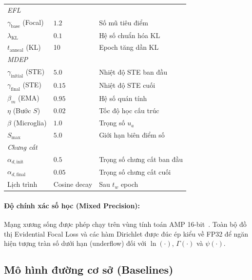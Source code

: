 \documentclass[11pt, a4paper]{article}
\begin{document}
\begin{table}[H]
\begin{tabular}{@{}lll@{}}
\midrule
\multicolumn{3}{l}{\emph{EFL}} \\
$\gamma_{\text{base}}$ (Focal) & $1.2$ & Số mũ tiêu điểm \\
$\lambda_{\text{KL}}$ & $0.1$ & Hệ số chuẩn hóa KL \\
$t_{\text{anneal}}$ (KL) & 10 & Epoch tăng dần KL \\
\midrule
\multicolumn{3}{l}{\emph{MDEP}} \\
$\gamma_{\text{initial}}$ (STE) & $5.0$ & Nhiệt độ STE ban đầu \\
$\gamma_{\text{final}}$ (STE) & $0.15$ & Nhiệt độ STE cuối \\
$\beta_m$ (EMA) & $0.95$ & Hệ số quán tính \\
$\eta$ (Bước $S$) & $0.02$ & Tốc độ học cấu trúc \\
$\beta$ (Microglia) & $1.0$ & Trọng số $u_a$ \\
$S_{\max}$ & $5.0$ & Giới hạn biên điểm số \\
\midrule
\multicolumn{3}{l}{\emph{Chưng cất}} \\
$\alpha_{d,\text{init}}$ & $0.5$ & Trọng số chưng cất ban đầu \\
$\alpha_{d,\text{final}}$ & $0.05$ & Trọng số chưng cất cuối \\
Lịch trình & Cosine decay & Sau $t_w$ epoch \\
\bottomrule
\end{tabular}
\end{table}

\paragraph{Độ chính xác số học (Mixed Precision):}
Mạng xương sống được phép chạy trên vùng tính toán AMP 16-bit~\cite{micikevicius2018mixed}. Toàn bộ đồ thị Evidential Focal Loss và các hàm Dirichlet được đúc ép kiểu về FP32 để ngăn hiện tượng tràn số dưới hạn (underflow) đối với $\ln(\cdot)$, $\Gamma(\cdot)$ và $\psi(\cdot)$.

\subsection{Mô hình đường cơ sở (Baselines)}\label{subsec:baselines}
\end{document}
